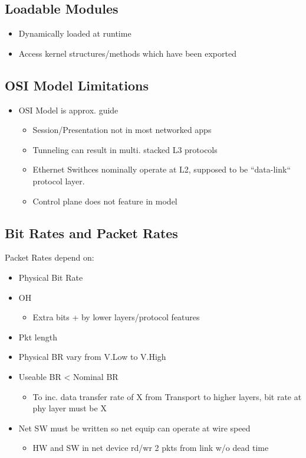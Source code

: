 \subsection{Loadable Modules}

\begin{itemize}
	\item Dynamically loaded at runtime
	\item Access kernel structures/methods which have been exported
\end{itemize}

\subsection{OSI Model Limitations}

\begin{itemize}
	\item OSI Model is approx. guide
	\begin{itemize}
		\item Session/Presentation not in most networked apps
		\item Tunneling can result in multi. stacked L3 protocols
		\item Ethernet Swithces nominally operate at L2, supposed to be
			``data-link`` protocol layer.
		\item Control plane does not feature in model
	\end{itemize}
\end{itemize}

\subsection{Bit Rates and Packet Rates}

Packet Rates depend on:

\begin{itemize}
	\item Physical Bit Rate
	\item OH
	\begin{itemize}
		\item Extra bits + by lower layers/protocol features
	\end{itemize}
	\item Pkt length
	\item Physical BR vary from V.Low to V.High
	\item Useable BR < Nominal BR
	\begin{itemize}
		\item To inc. data transfer rate of X from Transport to higher
			layers, bit rate at phy layer must be \gg X
	\end{itemize}
	\item Net SW must be written so net equip can operate at wire speed
	\begin{itemize}
		\item HW and SW in net device rd/wr 2 pkts from link w/o dead time
	\end{itemize}
\end{itemize}

